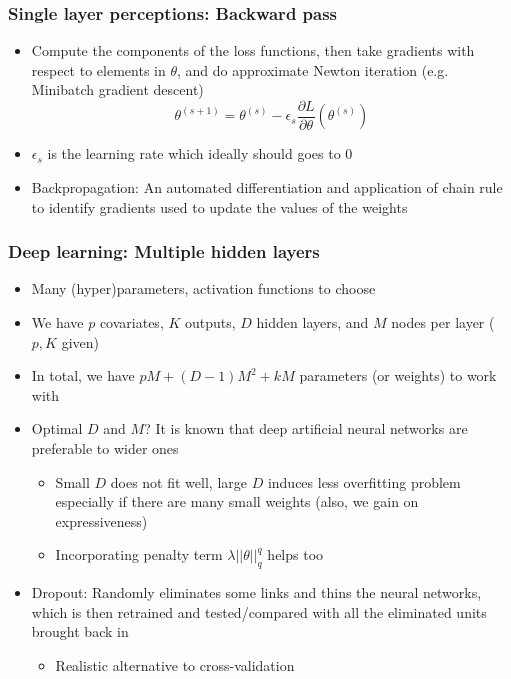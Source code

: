 \documentclass[aspectratio=169]{beamer}
\begin{document}
\begin{frame}
\frametitle{Single layer perceptions: Backward pass}
\begin{itemize}
\item Compute the components of the loss functions, then take gradients with respect to elements in $\theta$, and do approximate Newton iteration (e.g. Minibatch gradient descent)
\[
\theta^{(s+1)}=\theta^{(s)}-\epsilon_s\frac{\partial L}{\partial \theta}(\theta^{(s)})
\]
\item $\epsilon_s$ is the learning rate which ideally should goes to 0
\item Backpropagation: An automated differentiation and application of chain rule to identify gradients used to update the values of the weights
\end{itemize}
\end{frame}

\begin{frame}
\frametitle{Deep learning: Multiple hidden layers}
\begin{itemize}
\item Many (hyper)parameters, activation functions to choose
\item We have $p$ covariates, $K$ outputs, $D$ hidden layers, and $M$ nodes per layer ($p, K$ given)
\item  In total, we have $pM + (D-1)M^2 + kM$ parameters (or weights) to work with
\item Optimal $D$ and $M$? It is known that deep artificial neural networks are preferable to wider ones
\begin{itemize}
\item Small $D$ does not fit well, large $D$ induces less overfitting problem especially if there are many small weights (also, we gain on expressiveness)
\item Incorporating penalty term $\lambda ||\theta||_q^q$ helps too
\end{itemize}
\item Dropout: Randomly eliminates some links and thins the neural networks, which is then retrained and tested/compared with all the eliminated units brought back in
\begin{itemize}
\item Realistic alternative to cross-validation
\end{itemize}
\end{itemize}
\end{frame}
\end{document}
